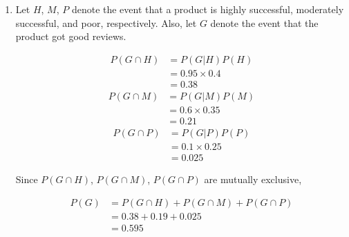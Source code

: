 \documentclass{article}
\begin{document}
\begin{enumerate}[label=(\alph*)]
    \item
        Let $H$, $M$, $P$ denote the event that a product is highly
        successful, moderately successful, and poor, respectively. Also, let
        $G$ denote the event that the product got good reviews.

        \begin{equation*}
            \begin{aligned}
                P(G \cap H) &= P(G \vert H) P(H)\\
                           &= 0.95 \times 0.4 \\
                           &= 0.38
            \end{aligned}
        \end{equation*}
        \begin{equation*}
            \begin{aligned}
                P(G \cap M) &= P(G \vert M) P(M)\\
                           &= 0.6 \times 0.35 \\
                           &= 0.21
            \end{aligned}
        \end{equation*}
        \begin{equation*}
            \begin{aligned}
                P(G \cap P) &= P(G \vert P) P(P)\\
                            &= 0.1 \times 0.25 \\
                            &= 0.025
            \end{aligned}
        \end{equation*}

        Since $P(G \cap H)$, $P(G \cap M)$, $P(G \cap P)$ are mutually
        exclusive,

        \begin{equation*}
            \begin{aligned}
                P(G) &= P(G \cap H) + P(G \cap M) + P(G \cap P) \\
                     &= 0.38 + 0.19 + 0.025 \\
                     &= 0.595
            \end{aligned}
        \end{equation*}


\end{enumerate}
\end{document}
